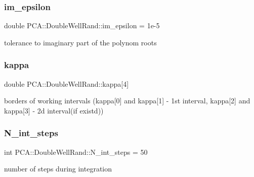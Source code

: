 \subsubsection{\texorpdfstring{im\+\_\+epsilon}{im\_epsilon}}
{\footnotesize\ttfamily double P\+C\+A\+::\+Double\+Well\+Rand\+::im\+\_\+epsilon = 1e-\/5\hspace{0.3cm}{\ttfamily [private]}}



tolerance to imaginary part of the polynom roots 

\hypertarget{class_p_c_a_1_1_double_well_rand_a4792680466fc8f865be362937b3e4e3b}{}\label{class_p_c_a_1_1_double_well_rand_a4792680466fc8f865be362937b3e4e3b} 
\subsubsection{\texorpdfstring{kappa}{kappa}}
{\footnotesize\ttfamily double P\+C\+A\+::\+Double\+Well\+Rand\+::kappa\mbox{[}4\mbox{]}\hspace{0.3cm}{\ttfamily [private]}}



borders of working intervals (kappa\mbox{[}0\mbox{]} and kappa\mbox{[}1\mbox{]} -\/ 1st interval, kappa\mbox{[}2\mbox{]} and kappa\mbox{[}3\mbox{]} -\/ 2d interval(if existd)) 

\hypertarget{class_p_c_a_1_1_double_well_rand_a935058a518ed28d62b9e2285c30382dc}{}\label{class_p_c_a_1_1_double_well_rand_a935058a518ed28d62b9e2285c30382dc} 
\subsubsection{\texorpdfstring{N\+\_\+int\+\_\+steps}{N\_int\_steps}}
{\footnotesize\ttfamily int P\+C\+A\+::\+Double\+Well\+Rand\+::\+N\+\_\+int\+\_\+steps = 50\hspace{0.3cm}{\ttfamily [private]}}



number of steps during integration 

\hypertarget{class_p_c_a_1_1_double_well_rand_a89c48e652127b71600906d93f628dad5}{}\label{class_p_c_a_1_1_double_well_rand_a89c48e652127b71600906d93f628dad5} 
